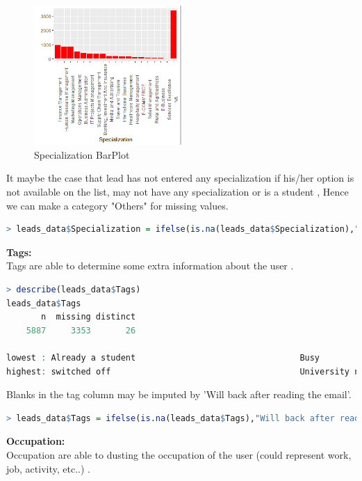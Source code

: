 \begin{figure}[H]
    \centering
    \includegraphics[width=0.5\textwidth]{assets/specialisation.png}
    \caption{ Specialization BarPlot}
\end{figure}
It maybe the case that lead has not entered any specialization if his/her option is not available on the list, may not have any specialization or is a student , Hence we can make a category "Others" for missing values.
\begin{lstlisting}[language=R]
> leads_data$Specialization = ifelse(is.na(leads_data$Specialization),"Others",leads_data$Specialization)
\end{lstlisting}
\textbf{Tags: }\\
Tags are able to determine some extra information about the user .
\begin{lstlisting}[language=R]
> describe(leads_data$Tags)
leads_data$Tags 
       n  missing distinct 
    5887     3353       26 

lowest : Already a student                                 Busy                                              Closed by Horizzon                                Diploma holder (Not Eligible)                     Graduation in progress                           
highest: switched off                                      University not recognized                         Want to take admission but has financial problems Will revert after reading the email               wrong number given
\end{lstlisting}
Blanks in the tag column may be imputed by 'Will back after reading the email'.
\begin{lstlisting}[language=R]
> leads_data$Tags = ifelse(is.na(leads_data$Tags),"Will back after reading the email",leads_data$Tags)
\end{lstlisting}
\textbf{Occupation: }\\
Occupation are able to dusting the occupation of the user (could represent work, job, activity, etc..) .
